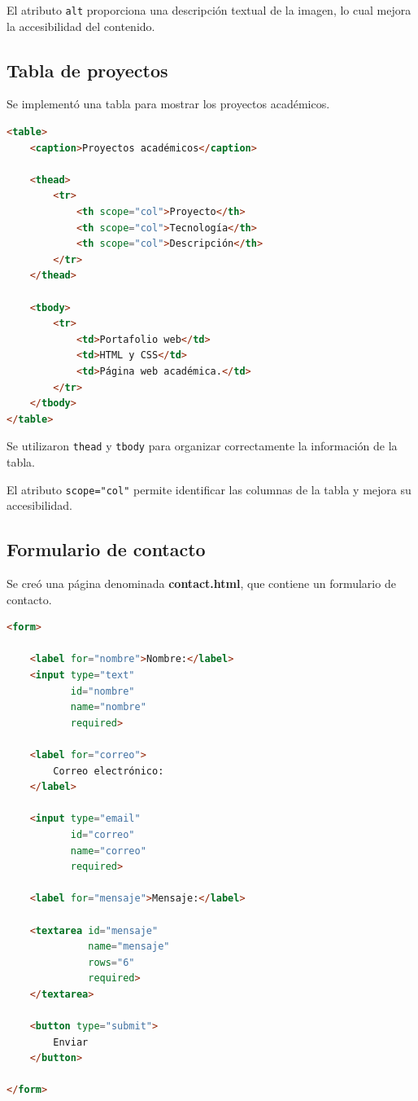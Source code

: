 \documentclass{article}
\begin{document}
El atributo \texttt{alt} proporciona una descripción textual
de la imagen, lo cual mejora la accesibilidad del contenido.


\subsection{Tabla de proyectos}

Se implementó una tabla para mostrar los proyectos académicos.

\begin{lstlisting}[language=HTML]
<table>
    <caption>Proyectos académicos</caption>

    <thead>
        <tr>
            <th scope="col">Proyecto</th>
            <th scope="col">Tecnología</th>
            <th scope="col">Descripción</th>
        </tr>
    </thead>

    <tbody>
        <tr>
            <td>Portafolio web</td>
            <td>HTML y CSS</td>
            <td>Página web académica.</td>
        </tr>
    </tbody>
</table>
\end{lstlisting}

Se utilizaron \texttt{thead} y \texttt{tbody} para organizar
correctamente la información de la tabla.

El atributo \texttt{scope="col"} permite identificar las
columnas de la tabla y mejora su accesibilidad.

\subsection{Formulario de contacto}

Se creó una página denominada \textbf{contact.html}, que contiene
un formulario de contacto.

\begin{lstlisting}[language=HTML]
<form>

    <label for="nombre">Nombre:</label>
    <input type="text"
           id="nombre"
           name="nombre"
           required>

    <label for="correo">
        Correo electrónico:
    </label>

    <input type="email"
           id="correo"
           name="correo"
           required>

    <label for="mensaje">Mensaje:</label>

    <textarea id="mensaje"
              name="mensaje"
              rows="6"
              required>
    </textarea>

    <button type="submit">
        Enviar
    </button>

</form>
\end{lstlisting}
\end{document}
